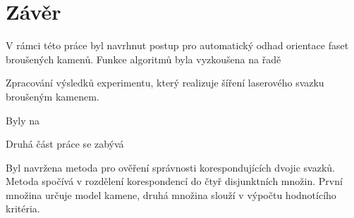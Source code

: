 \part{Závěr}
	V rámci této práce byl navrhnut postup pro automatický odhad orientace faset broušených kamenů. Funkce algoritmů byla vyzkoušena na řadě 
	
	
	Zpracování výsledků experimentu, který realizuje šíření laserového svazku broušeným kamenem.  

	Byly na
	
	Druhá část práce se zabývá
	
	Byl navržena metoda pro ověření správnosti korespondujících dvojic svazků. Metoda spočívá v rozdělení korespondencí do čtyř disjunktních množin. První množina určuje model kamene, druhá množina slouží v výpočtu hodnotícího kritéria. 
	
	 
	  
	 
	   
	
	